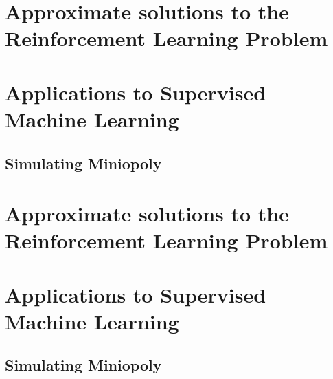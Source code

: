 \documentclass[colorful]{sty/itam-thesis}
\begin{document}
\part{Approximate solutions to the Reinforcement Learning 
Problem}


\part{Applications to Supervised Machine Learning}

\appendix

\chapter{Simulating Miniopoly}


\part{Approximate solutions to the Reinforcement Learning 
Problem}


\part{Applications to Supervised Machine Learning}

\appendix

\chapter{Simulating Miniopoly}


\nocite{*}
\printbibliography
\end{document}
